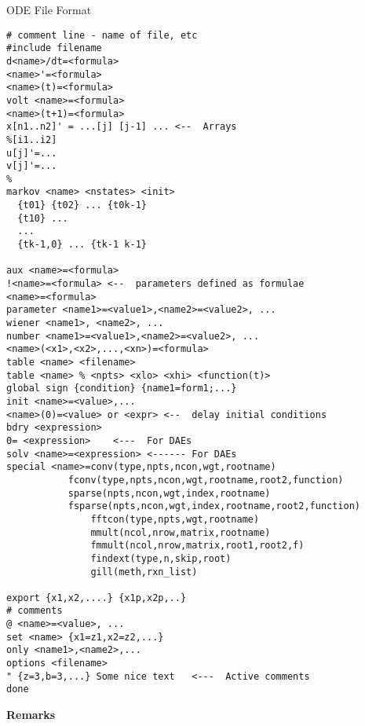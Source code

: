 \begin{center} {\large ODE File Format}\end{center}
\begin{verbatim}
# comment line - name of file, etc
#include filename   
d<name>/dt=<formula>
<name>'=<formula>
<name>(t)=<formula>
volt <name>=<formula>
<name>(t+1)=<formula>
x[n1..n2]' = ...[j] [j-1] ... <--  Arrays
%[i1..i2]
u[j]'=...
v[j]'=...
% 
markov <name> <nstates> <init>
  {t01} {t02} ... {t0k-1}
  {t10} ...
  ...
  {tk-1,0} ... {tk-1 k-1}

aux <name>=<formula>
!<name>=<formula> <--  parameters defined as formulae
<name>=<formula>
parameter <name1>=<value1>,<name2>=<value2>, ...
wiener <name1>, <name2>, ...
number <name1>=<value1>,<name2>=<value2>, ...
<name>(<x1>,<x2>,...,<xn>)=<formula>
table <name> <filename>
table <name> % <npts> <xlo> <xhi> <function(t)>
global sign {condition} {name1=form1;...}
init <name>=<value>,...
<name>(0)=<value> or <expr> <--  delay initial conditions
bdry <expression>
0= <expression>    <---  For DAEs
solv <name>=<expression> <------ For DAEs
special <name>=conv(type,npts,ncon,wgt,rootname)
	       fconv(type,npts,ncon,wgt,rootname,root2,function)
	       sparse(npts,ncon,wgt,index,rootname)
	       fsparse(npts,ncon,wgt,index,rootname,root2,function)
               fftcon(type,npts,wgt,rootname)
               mmult(ncol,nrow,matrix,rootname)
               fmmult(ncol,nrow,matrix,root1,root2,f)
               findext(type,n,skip,root)
               gill(meth,rxn_list)
          
export {x1,x2,....} {x1p,x2p,..}     
# comments
@ <name>=<value>, ...
set <name> {x1=z1,x2=z2,...}
only <name1>,<name2>,...
options <filename>
" {z=3,b=3,...} Some nice text   <---  Active comments 
done
\end{verbatim}
{\bf Remarks}
